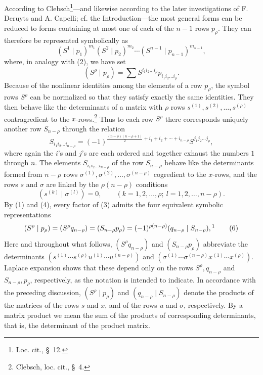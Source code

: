 \documentclass[11pt]{article}
\begin{document}
According to Clebsch\footnote{Loc. cit., \S\ 12.}---and likewise according to the later investigations of F. Deruyts and A. Capelli; cf. the Introduction---the most general forms can be reduced to forms containing at most one of each of the $n-1$ rows $p_\rho$. They can therefore be represented symbolically as
\begin{equation}
 (S^1\mid p_1)^{m_1}(S^2\mid p_2)^{m_2}\cdots(S^{n-1}\mid p_{n-1})^{m_{n-1}},
\tag{3}
\end{equation}
where, in analogy with (2), we have set
\[
 (S^\rho\mid p_\rho)=\sum S^{i_1i_2\ldots i_\rho}p_{i_1i_2\ldots i_\rho}.
\]
Because of the nonlinear identities among the elements of a row $p_\rho$, the symbol rows $S^\rho$ can be normalized so that they satisfy exactly the same identities. They then behave like the determinants of a matrix with $\rho$ rows $s^{(1)},s^{(2)},\ldots,s^{(\rho)}$ contragredient to the $x$-rows.\footnote{Clebsch, loc. cit., \S\ 4.} Thus to each row $S^\rho$ there corresponds uniquely another row $S_{n-\rho}$ through the relation
\begin{equation}
 S_{i_1i_2\ldots i_{n-\rho}}=(-1)^{\frac{(n-\rho)(n-\rho+1)}2+i_1+i_2+\cdots+i_{n-\rho}}S^{j_1j_2\ldots j_\rho},
\tag{4}
\end{equation}
where again the $i$'s and $j$'s are each ordered and together exhaust the numbers $1$ through $n$. The elements $S_{i_1i_2\ldots i_{n-\rho}}$ of the row $S_{n-\rho}$ behave like the determinants formed from $n-\rho$ rows $\sigma^{(1)},\sigma^{(2)},\ldots,\sigma^{(n-\rho)}$ cogredient to the $x$-rows, and the rows $s$ and $\sigma$ are linked by the $\rho(n-\rho)$ conditions
\begin{equation}
 (s^{(k)}\mid \sigma^{(l)})=0,\qquad(k=1,2,\ldots,\rho;\ l=1,2,\ldots,n-\rho).
\tag{5}
\end{equation}
By (1) and (4), every factor of (3) admits the four equivalent symbolic representations
\begin{equation}
 (S^\rho\mid p_\rho)=(S^\rho q_{n-\rho})=(S_{n-\rho}p_\rho)=(-1)^{\rho(n-\rho)}(q_{n-\rho}\mid S_{n-\rho}),\footnotemark
\tag{6}
\end{equation}
Here and throughout what follows, $(S^\rho q_{n-\rho})$ and $(S_{n-\rho}p_\rho)$ abbreviate the determinants
$(s^{(1)}\cdots s^{(\rho)}u^{(1)}\cdots u^{(n-\rho)})$ and
$(\sigma^{(1)}\cdots\sigma^{(n-\rho)}x^{(1)}\cdots x^{(\rho)})$.
Laplace expansion shows that these depend only on the rows $S^\rho,q_{n-\rho}$ and $S_{n-\rho},p_\rho$, respectively, as the notation is intended to indicate. In accordance with the preceding discussion, $(S^\rho\mid p_\rho)$ and $(q_{n-\rho}\mid S_{n-\rho})$ denote the products of the matrices of the rows $s$ and $x$, and of the rows $u$ and $\sigma$, respectively. By a matrix product we mean the sum of the products of corresponding determinants, that is, the determinant of the product matrix.
\end{document}
